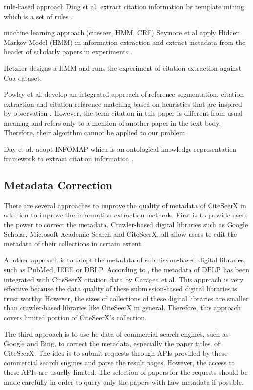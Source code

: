 \documentclass[prodmode]{acmsmall} %
\begin{document}
rule-based approach
Ding et al. extract citation information by template mining which is a set of rules \cite{ding1999template}.


machine learning approach (citeseer, HMM, CRF)
Seymore et al apply Hidden Markov Model (HMM) in information extraction and extract metadata from the header of scholarly papers in experiments \cite{seymore1999learning}.

Hetzner designs a HMM and runs the experiment of citation extraction against Coa dataset\cite{hetzner2008simple}.

Powley et al. develop an integrated approach of reference segmentation, citation extraction and citation-reference matching based on heuristics that are inspired by observation \cite{powley2007evidence}. However, the term citation in this paper is different from usual meaning and refers only to a mention of another paper in the text body. Therefore, their algorithm cannot be applied to our problem.


Day et al. adopt INFOMAP which is an ontological knowledge representation framework to extract citation information\cite{day2005knowledge} \cite{day2007reference}.

\subsection{Metadata Correction}

There are several approaches to improve the quality of metadata of CiteSeerX in addition to improve the information extraction methods. First is to provide users the power to correct the metadata. Crawler-based digital libraries such as Google Scholar, Microsoft Academic Search and CiteSeerX, all allow users to edit the metadata of their collections in certain extent. \cite{wu2014impact}

Another approach is to adopt the metadata of submission-based digital libraries, such as PubMed, IEEE or DBLP. According to \cite{ororbiaciteseerx}, the metadata of DBLP has been integrated with CiteSeerX citation data by Caragea et al. This approach is very effective because the data quality of these submission-based digital libraries is trust worthy. However, the sizes of collections of these digital libraries are smaller than crawler-based libraries like CiteSeerX in general. Therefore, this approach covers limited portion of CiteSeerX's collection.

The third approach is to use he data of commercial search engines, such as Google and Bing, to correct the metadata, especially the paper titles, of CiteSeerX. The idea is to submit requests through APIs provided by these commercial search engines and parse the result pages. However, the access to these APIs are usually limited. The selection of papers for the requests should be made carefully in order to query only the papers with flaw metadata if possible. \cite{ororbiaciteseerx}
\end{document}
